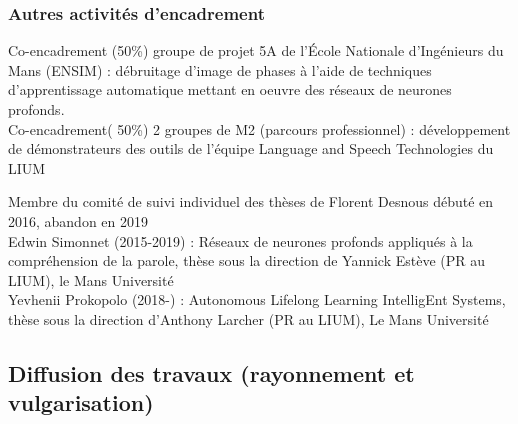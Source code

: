 \documentclass[11pt,a4paper]{article}
\begin{document}
\subsubsection{Autres activités d'encadrement}
\begin{description}[noitemsep, align=right, leftmargin=*, font=\normalfont]
	\item[Projets étudiants 2020] Co-encadrement (50\%) groupe de projet 5A de l’École Nationale d’Ingénieurs du Mans (ENSIM) : débruitage d'image de phases à l'aide de techniques d'apprentissage automatique mettant en oeuvre des réseaux de neurones profonds.\\
	Co-encadrement( 50\%) 2 groupes de M2 (parcours professionnel) : développement de démonstrateurs des outils de l'équipe Language and Speech Technologies du LIUM
	\item[CSI] Membre du comité de suivi individuel des thèses de Florent Desnous débuté en 2016, abandon en 2019\\
	Edwin Simonnet (2015-2019) : Réseaux de neurones profonds appliqués à la compréhension de la parole, thèse sous la direction de Yannick Estève (PR au LIUM), le Mans Université\\
	Yevhenii Prokopolo (2018-) : Autonomous Lifelong Learning IntelligEnt Systems, thèse sous la direction d’Anthony Larcher (PR au LIUM), Le Mans Université
\end{description}


\subsection{Diffusion des travaux (rayonnement et vulgarisation)}
\end{document}
